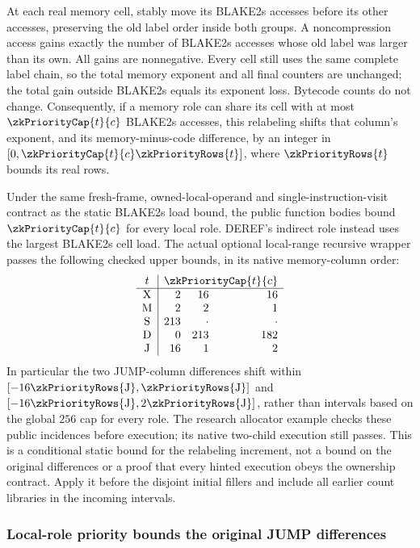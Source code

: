 At each real memory cell, stably move its BLAKE2s accesses before its other accesses, preserving the old label order inside both groups. A noncompression access gains exactly the number of BLAKE2s accesses whose old label was larger than its own. All gains are nonnegative. Every cell still uses the same complete label chain, so the total memory exponent and all final counters are unchanged; the total gain outside BLAKE2s equals its exponent loss. Bytecode counts do not change. Consequently, if a memory role can share its cell with at most $\zkPriorityCap{t}{c}$ BLAKE2s accesses, this relabeling shifts that column's exponent, and its memory-minus-code difference, by an integer in $[0,\zkPriorityCap{t}{c}\zkPriorityRows{t}]$, where $\zkPriorityRows{t}$ bounds its real rows.

Under the same fresh-frame, owned-local-operand and single-instruction-visit contract as the static BLAKE2s load bound, the public function bodies bound $\zkPriorityCap{t}{c}$ for every local role. DEREF's indirect role instead uses the largest BLAKE2s cell load. The actual optional local-range recursive wrapper passes the following checked upper bounds, in its native memory-column order:
\[
\begin{array}{c|rrr}
 t&\multicolumn{3}{c}{\zkPriorityCap{t}{c}}\\\hline
 \mathrm X&2&16&16\\
 \mathrm M&2&2&1\\
 \mathrm S&213&\cdot&\cdot\\
 \mathrm D&0&213&182\\
 \mathrm J&16&1&2
\end{array}
\]
In particular the two JUMP-column differences shift within $[-16\zkPriorityRows{\mathrm J},\zkPriorityRows{\mathrm J}]$ and $[-16\zkPriorityRows{\mathrm J},2\zkPriorityRows{\mathrm J}]$, rather than intervals based on the global $256$ cap for every role. The research allocator example checks these public incidences before execution; its native two-child execution still passes. This is a conditional static bound for the relabeling increment, not a bound on the original differences or a proof that every hinted execution obeys the ownership contract. Apply it before the disjoint initial fillers and include all earlier count libraries in the incoming intervals.

\subsubsection{Local-role priority bounds the original JUMP differences}

